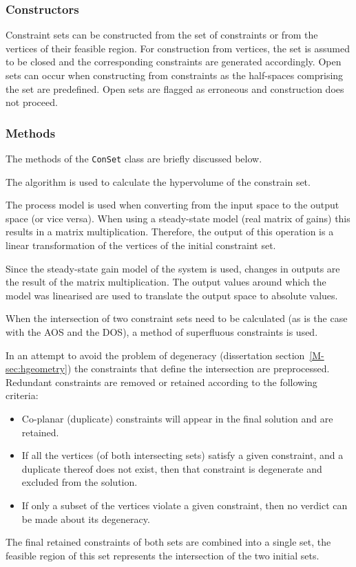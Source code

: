 \subsubsection{Constructors}
Constraint sets can be constructed from the set of constraints or from the vertices of their feasible region.
For construction from vertices, the set is assumed to be closed and the corresponding constraints are generated accordingly.
Open sets can occur when constructing from constraints as the half-spaces comprising the set are predefined.
Open sets are flagged as erroneous and construction does not proceed.

\subsubsection{Methods}
The methods of the \texttt{ConSet} class are briefly discussed below.

The \qhull algorithm is used to calculate the hypervolume of the constrain set.

The process model is used when converting from the input space to the output space (or vice versa).
When using a steady-state model (real matrix of gains) this results in a matrix multiplication.
Therefore, the output of this operation is a linear transformation of the vertices of the initial constraint set.

Since the steady-state gain model of the system is used, changes in outputs are the result of the matrix multiplication.
The output values around which the model was linearised are used to translate the output space to absolute values.  

When the intersection of two constraint sets need to be calculated (as is the case with the AOS and the DOS), a method of superfluous constraints is used.

In an attempt to avoid the problem of degeneracy (dissertation section~\ref{M-sec:hgeometry}) the constraints that define the intersection are preprocessed.
Redundant constraints are removed or retained according to the following criteria:
\begin{itemize}
\item Co-planar (duplicate) constraints will appear in the final solution and are retained.
\item If all the vertices (of both intersecting sets) satisfy a given constraint, and a duplicate thereof does not exist, then that constraint is degenerate and excluded from the solution.
\item If only a subset of the vertices violate a given constraint, then no verdict can be made about its degeneracy.
\end{itemize}
The final retained constraints of both sets are combined into a single set, the feasible region of this set represents the intersection of the two initial sets.

